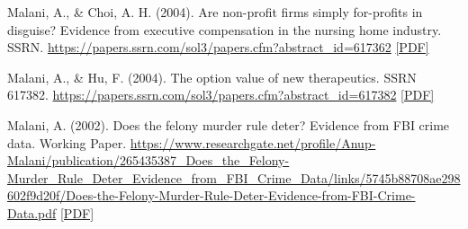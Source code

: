 \begin{tablist}
        \item[2004] \tab{}Malani, A., \& Choi, A. H. (2004). Are non-profit firms simply for-profits in disguise? Evidence from executive compensation in the nursing home industry. SSRN. \href{https://papers.ssrn.com/sol3/papers.cfm?abstract_id=617362}{https://papers.ssrn.com/sol3/papers.cfm?abstract\_id=617362} \href{https://github.com/anup-malani/website_personal/blob/main/publications/2004_MalaniChoi_NonProfitNursingHome.pdf}{[PDF]} 

        \item[2004] \tab{}Malani, A., \& Hu, F. (2004). The option value of new therapeutics. SSRN 617382. \href{https://papers.ssrn.com/sol3/papers.cfm?abstract_id=617382}{https://papers.ssrn.com/sol3/papers.cfm?abstract\_id=617382} \href{https://github.com/anup-malani/website_personal/blob/main/publications/2004_MalaniHu_OptionValueNewTherapeutics.pdf}{[PDF]} 

        \item[2002] \tab{}Malani, A. (2002). Does the felony murder rule deter? Evidence from FBI crime data. Working Paper. \href{https://www.researchgate.net/profile/Anup-Malani/publication/265435387_Does_the_Felony-Murder_Rule_Deter_Evidence_from_FBI_Crime_Data/links/5745b88708ae298602f9d20f/Does-the-Felony-Murder-Rule-Deter-Evidence-from-FBI-Crime-Data.pdf}{https://www.researchgate.net/profile/Anup-Malani/publication/265435387\_Does\_the\_Felony-Murder\_Rule\_Deter\_Evidence\_from\_FBI\_Crime\_Data/links/5745b88708ae298602f9d20f/Does-the-Felony-Murder-Rule-Deter-Evidence-from-FBI-Crime-Data.pdf} \href{https://github.com/anup-malani/website_personal/blob/main/publications/2002_Malani_FelonyMurderRule.pdf}{[PDF]}

    \end{tablist}
